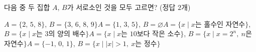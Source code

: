 다음 중 두 집합 $A$, $B$가 서로소인 것을 모두 고르면? (정답 $2$개)
\begin{choicesv}{$A=\{2,\,5,\,8\}$, $B=\{3,\,6,\,8,\,9\}$}{$A=\{1,\,3,\,5\}$, $B=\varnothing$}{$A=\{x \mid x$는 홀수인 자연수$\}$, $B=\{x \mid x$는 $3$의 양의 배수$\}$}{$A=\{x \mid x$는 $10$보다 작은 소수$\}$, $B=\{x \mid x=2^n,\ n$은 자연수$\}$}{$A=\{-1,\,0,\,1\}$, $B=\{x \mid |x|>1,\ x$는 정수$\}$}\end{choicesv}
